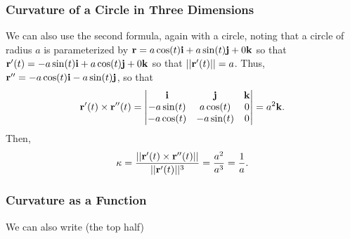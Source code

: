 \subsubsection{Curvature of a Circle in Three Dimensions}

We can also use the second formula, again with a circle, noting that a circle of radius \(a\) is parameterized by \(\mathbf{r} = a \cos(t)\mathbf{i} + a \sin(t)\mathbf{j} + 0\mathbf{k}\) so that \(\mathbf{r}'(t) = -a \sin(t)\mathbf{i} + a \cos(t)\mathbf{j} + 0\mathbf{k}\) so that \(||\mathbf{r}'(t)|| = a\). Thus, \(\mathbf{r}'' = -a \cos(t)\mathbf{i} - a \sin(t)\mathbf{j}\), so that 
\[
    \mathbf{r}'(t) \times \mathbf{r}''(t) = \begin{vmatrix}
        \mathbf{i} & \mathbf{j} & \mathbf{k} \\
        -a \sin(t) & a \cos(t) & 0 \\
        -a \cos(t) & -a \sin(t) & 0
    \end{vmatrix} = a^{2}\mathbf{k}.
\] 
Then, 
\[
    \kappa = \frac{||\mathbf{r}'(t) \times \mathbf{r}''(t)||}{||\mathbf{r}'(t)||^{3}} = \frac{a^{2}}{a^{3}} = \frac{1}{a}.
\]
\subsubsection{Curvature as a Function}

We can also write (the top half)